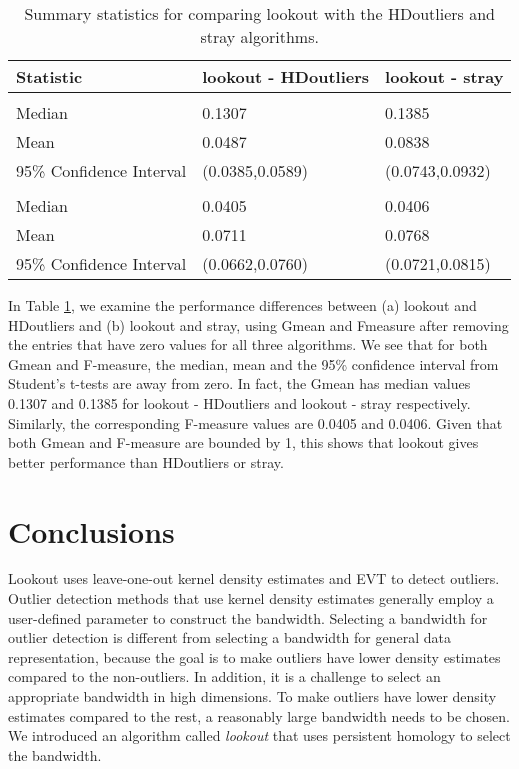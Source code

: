 \documentclass[12pt]{article}
\theoremstyle{definition}
\theoremstyle{definition}
\theoremstyle{definition}
\theoremstyle{definition}
\theoremstyle{remark}
\begin{document}
\begin{table}

\caption{\label{tab:table}Summary statistics for comparing lookout with the HDoutliers and stray algorithms.}
\centering
\fontsize{10}{12}\selectfont
\begin{tabular}[t]{lll}
\toprule
Statistic & lookout - HDoutliers & lookout - stray\\
\midrule
\addlinespace[0.3em]
\multicolumn{3}{l}{\textbf{Fmeasure}}\\
\hspace{1em}Median & 0.1307 & 0.1385\\
\hspace{1em}Mean & 0.0487 & 0.0838\\
\hspace{1em}95\% Confidence Interval & (0.0385,0.0589) & (0.0743,0.0932)\\
\addlinespace[0.3em]
\multicolumn{3}{l}{\textbf{Gmean}}\\
\hspace{1em}Median & 0.0405 & 0.0406\\
\hspace{1em}Mean & 0.0711 & 0.0768\\
\hspace{1em}95\% Confidence Interval & (0.0662,0.0760) & (0.0721,0.0815)\\
\bottomrule
\end{tabular}
\end{table}

In Table \ref{tab:table}, we examine the performance differences between
(a) lookout and HDoutliers and
(b) lookout and stray,
using Gmean and Fmeasure after removing the entries that have zero values for all three algorithms.
We see that for both Gmean and F-measure, the median, mean and the 95\% confidence interval from Student's t-tests are away from zero. In fact, the Gmean has median values 0.1307 and 0.1385 for lookout - HDoutliers and lookout - stray respectively. Similarly, the corresponding F-measure values are 0.0405 and 0.0406. Given that both Gmean and F-measure are bounded by 1, this shows that lookout gives better performance than HDoutliers or stray.

\hypertarget{sec:conclusions}{%
\section{Conclusions}\label{sec:conclusions}}

Lookout uses leave-one-out kernel density estimates and EVT to detect outliers. Outlier detection methods that use kernel density estimates generally employ a user-defined parameter to construct the bandwidth. Selecting a bandwidth for outlier detection is different from selecting a bandwidth for general data representation, because the goal is to make outliers have lower density estimates compared to the non-outliers. In addition, it is a challenge to select an appropriate bandwidth in high dimensions. To make outliers have lower density estimates compared to the rest, a reasonably large bandwidth needs to be chosen. We introduced an algorithm called \emph{lookout} that uses persistent homology to select the bandwidth.
\end{document}
